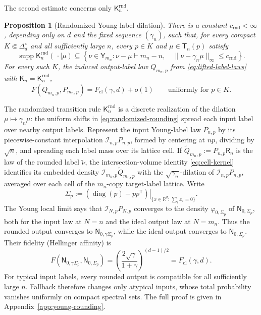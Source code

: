 \documentclass[11pt]{article}
\newtheorem{proposition}[proposition]{Proposition}
\theoremstyle{remark}
\theoremstyle{plain}
\newcommand{\R}{\mathbb R}
\newcommand{\diag}{\operatorname{diag}}
\newcommand{\Fcl}{F_{\mathrm{cl}}}
\begin{document}
The second estimate concerns only \(\mathsf K_n^{\mathrm{rnd}}\).

\begin{proposition}[Randomized Young-label dilation]
\label{prop:young-rounding}
There is a constant \(c_{\mathrm{rnd}}<\infty\), depending only on \(d\) and
the fixed sequence \((\gamma_n)\), such that, for every compact
\(K\Subset\Delta_d^\circ\) and all sufficiently large \(n\), every
\(p\in K\) and \(\mu\in\mathsf T_n(p)\) satisfy
\begin{equation}\label{eq:rounding-support}
  \operatorname{supp}\mathsf K_n^{\mathrm{rnd}}(\,\cdot\mid\mu)
  \subseteq
  \left\{\nu\in\mathsf Y_{m_n}:
    \nu-\mu\vdash m_n-n,\quad
    \|\nu-\gamma_n\mu\|_\infty\le c_{\mathrm{rnd}}
  \right\}.
\end{equation}
For every such \(K\), the induced output-label law \(Q_{m_n,p}\) from
\eqref{eq:lifted-label-laws} with \(\mathsf K_n=\mathsf K_n^{\mathrm{rnd}}\),
\begin{equation}\label{eq:rounding-label-fidelity}
  F(Q_{m_n,p},P_{m_n,p})
  =\Fcl(\gamma,d)+o(1)
  \qquad\text{uniformly for }p\in K.
\end{equation}
\end{proposition}

The randomized transition rule \(\mathsf K_n^{\mathrm{rnd}}\) is a discrete
realization of the dilation \(\mu\mapsto\gamma_n\mu\): the uniform shifts in
\eqref{eq:randomized-rounding} spread each input label over nearby output
labels.  Represent the input Young-label law \(P_{n,p}\) by its
piecewise-constant interpolation \(\mathcal I_{n,p}P_{n,p}\), formed by
centering at \(np\), dividing by \(\sqrt n\), and spreading each label mass
over its lattice cell.  If \(\widetilde Q_{m_n,p}:=P_{n,p}\mathsf R_n\) is the law of
the rounded label \(\widetilde\nu\), the intersection-volume identity
\eqref{eq:cell-kernel}
identifies its embedded density \(\mathcal I_{m_n,p}\widetilde Q_{m_n,p}\)
with the \(\sqrt{\gamma_n}\)-dilation of \(\mathcal I_{n,p}P_{n,p}\), averaged
over each cell of the \(m_n\)-copy target-label
lattice.  Write
\begin{equation}\label{eq:young-covariance}
  \Sigma_p
  :=\left.(\diag(p)-pp^{\mathsf T})\right|_{
    \{x\in\R^d:\,\sum_i x_i=0\}}.
\end{equation}
The Young local limit says that \(\mathcal I_{N,p}P_{N,p}\) converges to
the density \(\varphi_{0,\Sigma_p}\) of \(\mathsf N_{0,\Sigma_p}\), both
for the input law at \(N=n\) and the ideal output law at \(N=m_n\).
Thus the rounded output converges to
\(\mathsf N_{0,\gamma\Sigma_p}\), while the ideal output converges to
\(\mathsf N_{0,\Sigma_p}\).  Their fidelity (Hellinger affinity) is
\begin{equation}\label{eq:label-gaussian-affinity}
  F\!\left(\mathsf N_{0,\gamma\Sigma_p},
           \mathsf N_{0,\Sigma_p}\right)
  =\left(\frac{2\sqrt\gamma}{1+\gamma}\right)^{(d-1)/2}
  =\Fcl(\gamma,d).
\end{equation}
For typical input labels, every rounded output is compatible for all
sufficiently large \(n\).  Fallback therefore changes only atypical inputs,
whose total probability vanishes uniformly on compact spectral sets.
The full proof is given in
Appendix~\ref{app:young-rounding}.
\end{document}
